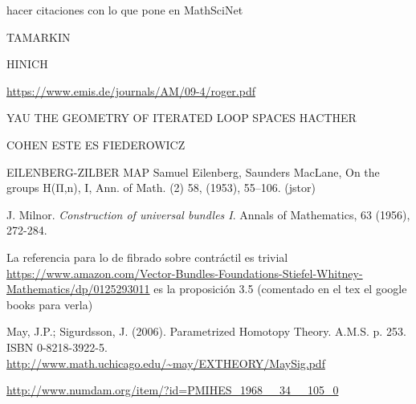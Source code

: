 \documentclass[TFM.tex]{subfiles}
\begin{document}
%


\begin{thebibliography}{}






 hacer citaciones con lo que pone en MathSciNet

 TAMARKIN

 HINICH

 \url{https://www.emis.de/journals/AM/09-4/roger.pdf}





 YAU
 THE GEOMETRY OF ITERATED LOOP SPACES
 HACTHER

 COHEN
 ESTE ES FIEDEROWICZ

 EILENBERG-ZILBER MAP Samuel Eilenberg, Saunders MacLane, On the groups H(Π,n), I, Ann. of Math. (2) 58, (1953), 55–106. (jstor)


 J. Milnor. \emph{Construction of universal bundles I}. Annals of Mathematics, 63 (1956), 272-284. 

 La referencia para lo de fibrado sobre contráctil es trivial \url{https://www.amazon.com/Vector-Bundles-Foundations-Stiefel-Whitney-Mathematics/dp/0125293011} es la proposición 3.5 (comentado en el tex el google books para verla) %

 May, J.P.; Sigurdsson, J. (2006). Parametrized Homotopy Theory. A.M.S. p. 253. ISBN 0-8218-3922-5. \url{http://www.math.uchicago.edu/~may/EXTHEORY/MaySig.pdf}

 \url{http://www.numdam.org/item/?id=PMIHES_1968__34__105_0}

\end{thebibliography}
\end{document}
